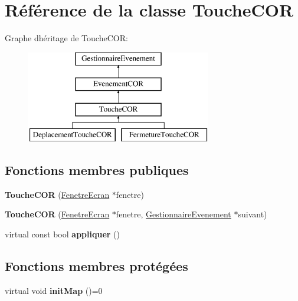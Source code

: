 \hypertarget{class_touche_c_o_r}{}\section{Référence de la classe Touche\+C\+OR}
\label{class_touche_c_o_r}
Graphe d\textquotesingle{}héritage de Touche\+C\+OR\+:\begin{figure}[H]
\begin{center}
\leavevmode
\includegraphics[height=4.000000cm]{class_touche_c_o_r}
\end{center}
\end{figure}
\subsection*{Fonctions membres publiques}
\begin{DoxyCompactItemize}
\item 
\mbox{\label{class_touche_c_o_r_a2e876ba91f2545d8c245336e442744ba}} 
{\bfseries Touche\+C\+OR} (\mbox{\hyperlink{class_fenetre_ecran}{Fenetre\+Ecran}} $\ast$fenetre)
\item 
\mbox{\label{class_touche_c_o_r_af3fc788ba83fd5d00f8fdd890e6c095d}} 
{\bfseries Touche\+C\+OR} (\mbox{\hyperlink{class_fenetre_ecran}{Fenetre\+Ecran}} $\ast$fenetre, \mbox{\hyperlink{class_gestionnaire_evenement}{Gestionnaire\+Evenement}} $\ast$suivant)
\item 
\mbox{\label{class_touche_c_o_r_a27641bba73bb7dcd7101a1dea8623e60}} 
virtual const bool {\bfseries appliquer} ()
\end{DoxyCompactItemize}
\subsection*{Fonctions membres protégées}
\begin{DoxyCompactItemize}
\item 
\mbox{\label{class_touche_c_o_r_ad4f62c88d0b4b120aa240c3c08e373cb}} 
virtual void {\bfseries init\+Map} ()=0
\end{DoxyCompactItemize}
